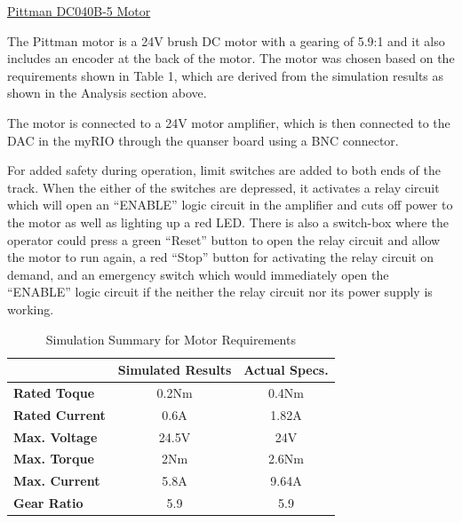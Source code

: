 \vspace{.167in}
\noindent\underline{Pittman DC040B-5 Motor}\par
\vspace{.08in}
The Pittman motor is a 24V brush DC motor with a gearing of 5.9:1 and it also includes an encoder at the back of the motor. The motor was chosen based on the requirements shown in Table 1, which are derived from the simulation results as shown in the Analysis section above. \par
The motor is connected to a 24V motor amplifier, which is then connected to the DAC in the myRIO through the quanser board using a BNC connector.\par
For added safety during operation, limit switches are added to both ends of the track. When the either of the switches are depressed, it activates a relay circuit which will open an ``ENABLE'' logic circuit in the amplifier and cuts off power to the motor as well as lighting up a red LED. There is also a switch-box where the operator could press a green ``Reset'' button to open the relay circuit and allow the motor to run again, a red ``Stop'' button for activating the relay circuit on demand, and an emergency switch which would immediately open the ``ENABLE'' logic circuit if the neither the relay circuit nor its power supply is working.\par

\begin{table}[]
\centering
\caption{Simulation Summary for Motor Requirements}
\label{Table 1}
\begin{tabular}{|l|c|c|}
\hline
                       & \textbf{Simulated Results} & \textbf{Actual Specs.} \\ \hline
\textbf{Rated Toque}   & 0.2Nm                      & 0.4Nm                  \\ \hline
\textbf{Rated Current} & 0.6A                       & 1.82A                  \\ \hline
\textbf{Max. Voltage}  & 24.5V                      & 24V                    \\ \hline
\textbf{Max. Torque}   & 2Nm                        & 2.6Nm                  \\ \hline
\textbf{Max. Current}  & 5.8A                       & 9.64A                  \\ \hline
\textbf{Gear Ratio}    & 5.9                        & 5.9                    \\ \hline
\end{tabular}
\end{table}

